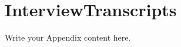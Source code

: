 \chapter{InterviewTranscripts} \label{Appendix:InterviewTranscripts}

Write your Appendix content here.